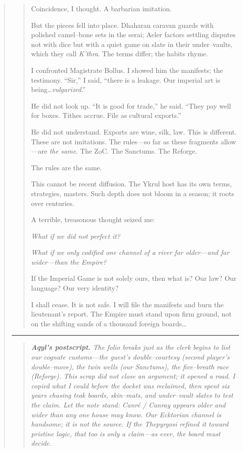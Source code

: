 \documentclass[11pt]{article}
\begin{document}
\begin{quote}
\begin{quote}
\smallskip
\noindent
Coincidence, I thought. A barbarian imitation.

\smallskip
\noindent
But the pieces fell into place. Dhaharan caravan guards with polished camel--bone sets in the serai; Aeler factors settling disputes not with dice but with a quiet game on slate in their under--vaults, which they call \emph{K’thra}. The terms differ; the habits rhyme.

\smallskip
\noindent
I confronted Magistrate Bollus. I showed him the manifests; the testimony. ``Sir,'' I said, ``there is a leakage. Our imperial art is being\ldots \emph{vulgarized}.''

\smallskip
\noindent
He did not look up. ``It is good for trade,'' he said. ``They pay well for boxes. Tithes accrue. File as cultural exports.''

\smallskip
\noindent
He did not understand. Exports are wine, silk, law. This is different. These are not imitations. The rules---so far as these fragments allow---are \emph{the same}. The ZoC. The Sanctums. The Reforge.

\smallskip
\noindent
The rules are the same.

\smallskip
\noindent
This cannot be recent diffusion. The Ykrul host has its own terms, strategies, masters. Such depth does not bloom in a season; it roots over centuries.

\smallskip
\noindent
A terrible, treasonous thought seized me:

\smallskip
\noindent
\emph{What if we did not perfect it?}

\noindent
\emph{What if we only codified one channel of a river far older---and far wider---than the Empire?}

\smallskip
\noindent
If the Imperial Game is not solely ours, then what is? Our law? Our language? Our very identity?

\smallskip
\noindent
I shall cease. It is not safe. I will file the manifests and burn the lieutenant’s report. The Empire must stand upon firm ground, not on the shifting sands of a thousand foreign boards\ldots
\end{quote}

\medskip
\noindent\rule{0.82\linewidth}{0.4pt}

\medskip
\medskip
\begin{quote}\small\itshape
\textbf{Aqyl’s postscript.} The folio breaks just as the clerk begins to list our cognate customs---the guest’s double--courtesy (second player’s double--move), the twin wells (our Sanctums), the five--breath race (Reforge). This scrap did not close an argument; it opened a road. I copied what I could before the docket was reclaimed, then spent six years chasing teak boards, skin--mats, and under--vault slates to test the claim. Let the note stand: \emph{Canré / Canray} appears older and wider than any one house may know. Our Ecktorian channel is handsome; it is not the source. If the Thepyrgosi refined it toward pristine logic, that too is only a claim---as ever, the board must decide.
\end{quote}


\end{quote}
\end{document}
